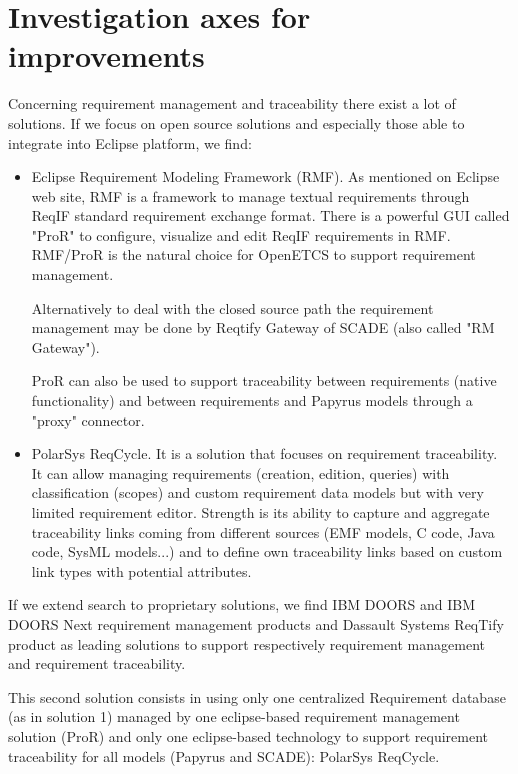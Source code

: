 \documentclass[11pt]{template/openetcs_report}
\begin{document}
\section{Investigation axes for improvements}
Concerning requirement management and traceability there exist a lot of solutions. If we focus on open source solutions and especially those able to integrate into Eclipse platform, we find:
\begin{itemize}
\item Eclipse Requirement Modeling Framework (RMF). As mentioned on Eclipse web site, RMF is a framework to manage textual requirements through ReqIF standard requirement exchange format. There is a powerful GUI called "ProR" to configure, visualize and edit ReqIF requirements in RMF.
RMF/ProR is the natural choice for OpenETCS to support requirement management.

Alternatively to deal with the closed source path the requirement management may
be done by Reqtify Gateway of SCADE (also called "RM Gateway"). 

ProR can also be used to support traceability between requirements (native functionality) and between requirements and Papyrus models through a "proxy" connector.

\item PolarSys ReqCycle. It is a solution that focuses on requirement traceability. It can allow managing requirements (creation, edition, queries) with classification (scopes) and custom requirement data models but with very limited requirement editor. Strength is its ability to capture and aggregate traceability links coming from different sources (EMF models, C code, Java code, SysML models...) and to define own traceability links based on custom link types with potential attributes.

\end{itemize}

If we extend search to proprietary solutions, we find IBM DOORS and IBM DOORS Next requirement management products and Dassault Systems ReqTify product as leading solutions to support respectively requirement management and requirement traceability.

This second solution consists in using only one centralized Requirement database (as in solution 1) managed by one eclipse-based requirement management solution (ProR) and only one eclipse-based technology to support requirement traceability for all models (Papyrus and SCADE): PolarSys ReqCycle.
\end{document}
